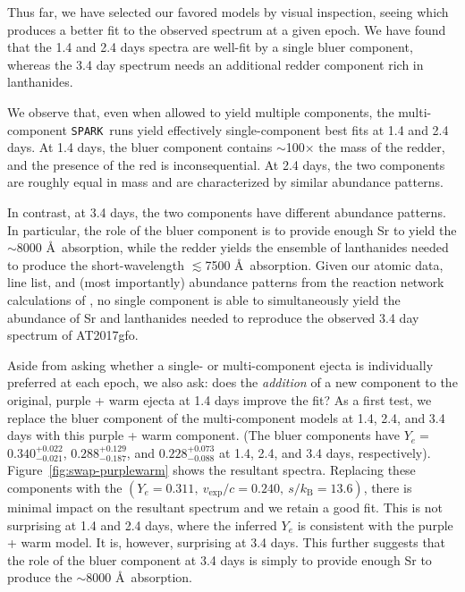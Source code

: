 \documentclass[twocolumn,twocolappendix]{aastex63}
\def\SPARK{\texttt{SPARK}}
\begin{document}
Thus far, we have selected our favored models by visual inspection, seeing which produces a better fit to the observed spectrum at a given epoch. We have found that the 1.4 and 2.4 days spectra are well-fit by a single bluer component, whereas the 3.4 day spectrum needs an additional redder component rich in lanthanides. 

We observe that, even when allowed to yield multiple components, the multi-component \SPARK~runs yield effectively single-component best fits at 1.4 and 2.4 days. At 1.4 days, the bluer component contains $\sim$100$\times$ the mass of the redder, and the presence of the red is inconsequential. At 2.4 days, the two components are roughly equal in mass and are characterized by similar abundance patterns. 

In contrast, at 3.4 days, the two components have different abundance patterns. In particular, the role of the bluer component is to provide enough Sr to yield the $\sim$8000 \AA~absorption, while the redder yields the ensemble of lanthanides needed to produce the short-wavelength $\lesssim$7500 \AA~absorption. Given our atomic data, line list, and (most importantly) abundance patterns from the reaction network calculations of \cite{wanajo18}, no single component is able to simultaneously yield the abundance of Sr and lanthanides needed to reproduce the observed 3.4 day spectrum of AT2017gfo.

Aside from asking whether a single- or multi-component ejecta is individually preferred at each epoch, we also ask: does the \textit{addition} of a new component to the original, purple + warm ejecta at 1.4 days improve the fit? As a first test, we replace the bluer component of the multi-component models at 1.4, 2.4, and 3.4 days with this purple + warm component. (The bluer components have $Y_{e} = $ $ 0.340^{+0.022}_{-0.021}$, $0.288^{+0.129}_{-0.187}$, and $0.228^{+0.073}_{-0.088}$ at 1.4, 2.4, and 3.4 days, respectively). Figure~\ref{fig:swap-purplewarm} shows the resultant spectra. Replacing these components with the $(Y_e = 0.311,~v_{\mathrm{exp}}/c=0.240,~s / k_{\mathrm{B}}=13.6)$, there is minimal impact on the resultant spectrum and we retain a good fit.  This is not surprising at 1.4 and 2.4 days, where the inferred $Y_e$ is consistent with the purple + warm model. It is, however, surprising at 3.4 days. This further suggests that the role of the bluer component at 3.4 days is simply to provide enough Sr to produce the $\sim$8000 \AA~absorption. 
\end{document}
